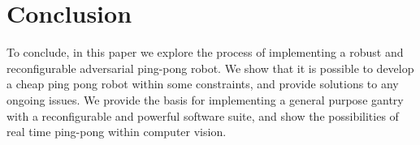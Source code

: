 \chapter{Conclusion}
To conclude, in this paper we explore the process of implementing a robust and reconfigurable adversarial ping-pong robot. We show that it is possible to develop a cheap ping pong robot within some constraints, and provide solutions to any ongoing issues. We provide the basis for implementing a general purpose gantry with a reconfigurable and powerful software suite, and show the possibilities of real time ping-pong within computer vision.